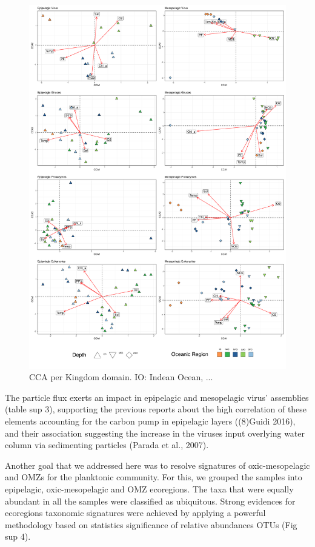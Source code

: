 \documentclass[fleqn,10pt]{wlscirep}
\begin{document}
\begin{figure}[ht]
    \centering
    \includegraphics[scale=0.35]{images/custom_cca_plot_hellinger_no_bathy_labels_OS_regions_colors_to_print.pdf}
    \caption{CCA per Kingdom domain. IO: Indean Ocean, ...}
    \label{fig:cca_OS}
\end{figure}

The particle flux exerts an impact in epipelagic and mesopelagic virus’ assemblies (table sup 3), supporting the previous reports about the high correlation of these elements accounting for the carbon pump in epipelagic layers ((8)Guidi 2016), and their association suggesting the increase in the viruses input overlying water column via sedimenting particles (Parada et al., 2007).

Another goal that we addressed here was to resolve signatures of oxic-mesopelagic and OMZs for the planktonic community. For this, we grouped the samples into epipelagic, oxic-mesopelagic and OMZ ecoregions. The taxa that were equally abundant in all the samples were classified as ubiquitous. Strong evidences for ecoregions taxonomic signatures were achieved by applying a powerful methodology based on statistics significance of relative abundances OTUs (Fig sup 4).
\end{document}
